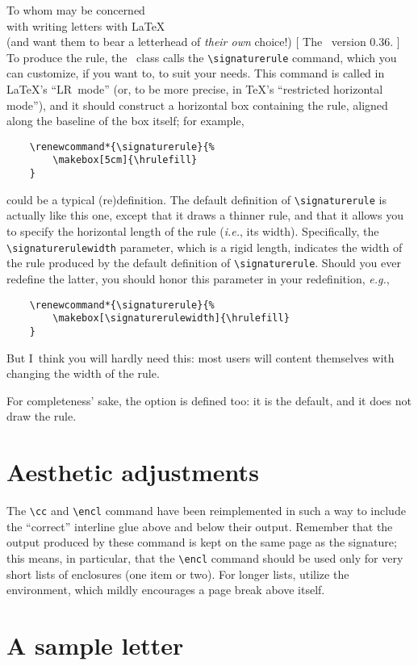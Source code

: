 \begin{letterhead}{
	To whom may be concerned\\
	with writing letters with \LaTeX\\
	(and want them to bear a letterhead
	of \emph{their own} choice!)
}[
	The \Bundle\ version 0.36.
]
To produce the rule, the \lcdp\ class calls the \verb|\signaturerule| command,
which you can customize, if you want to, to suit your needs.  This command is
called in \LaTeX's ``LR~mode'' (or, to be more precise, in \TeX's ``restricted
horizontal mode''), and it should construct a horizontal box containing the
rule, aligned along the baseline of the box itself; for example,
%
\begin{verbatim}
	\renewcommand*{\signaturerule}{%
	    \makebox[5cm]{\hrulefill}
	}
\end{verbatim}
%
could be a typical (re)definition.  The default definition of
\verb|\signaturerule| is actually like this one, except that it draws a thinner
rule, and that it allows you to specify the horizontal length of the rule
(\emph{i.e.}, its width).  Specifically, the \verb|\signaturerulewidth|
parameter, which is a rigid length, indicates the width of the rule produced by
the default definition of \verb|\signaturerule|.  Should you ever redefine the
latter, you should honor this parameter in your redefinition, \emph{e.g.},
%
\begin{verbatim}
	\renewcommand*{\signaturerule}{%
	    \makebox[\signaturerulewidth]{\hrulefill}
	}
\end{verbatim}
%
But I~think you will hardly need this: most users will content themselves with
changing the width of the rule.

For completeness' sake, the  option is defined too: it is
the default, and it does not draw the rule.



\section{Aesthetic adjustments}
\label{S:Adjustments}

The \verb|\cc| and \verb|\encl| command have been reimplemented in such a way to
include the ``correct'' interline glue above and below their output.  Remember
that the output produced by these command is kept on the same page as the
signature; this means, in particular, that the \verb|\encl| command should be
used only for very short lists of enclosures (one item or two).  For longer
lists, utilize the  environment, which mildly encourages a page
break above itself.



\section{A sample letter}
\label{S:Sample}


\end{letterhead}
